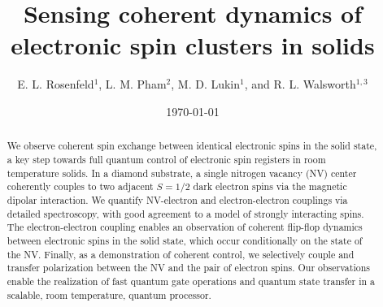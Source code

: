 \documentclass[%
 reprint,
 amsmath,amssymb,
 aps,
]{revtex4-1}
\begin{document}


\title{Sensing coherent dynamics of electronic spin clusters in solids}%

\author{E. L. Rosenfeld$^{1}$, L. M. Pham$^{2}$, M. D. Lukin$^{1}$, and R. L. Walsworth$^{1,3}$}
%


\date{\today}%

\begin{abstract}
We observe coherent spin exchange between identical electronic spins in the solid state, a key step towards full quantum control of electronic spin registers in room temperature solids. In a diamond substrate, a single nitrogen vacancy (NV) center coherently couples to two adjacent $S=1/2$ dark electron spins via the magnetic dipolar interaction. We quantify NV-electron and electron-electron couplings via detailed spectroscopy, with good agreement to a model of strongly interacting spins. The electron-electron coupling enables an observation of coherent flip-flop dynamics between electronic spins in the solid state, which occur conditionally on the state of the NV. Finally, as a demonstration of coherent control, we selectively couple and transfer polarization between the NV and the pair of electron spins. Our observations enable the realization of fast quantum gate operations and quantum state transfer in a scalable, room temperature, quantum processor.
\end{abstract}
\end{document}
